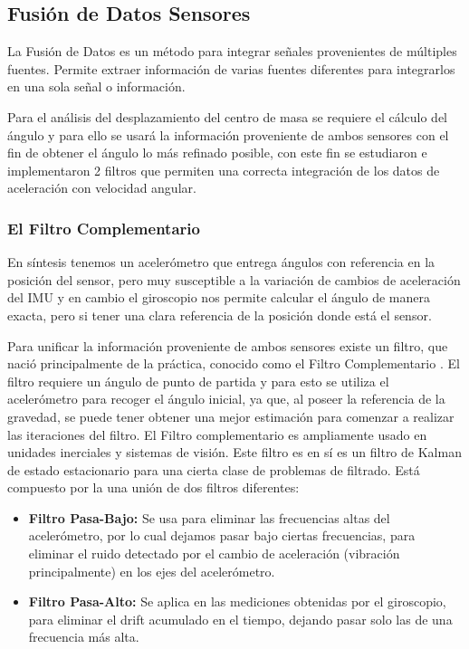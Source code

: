 \documentclass[12pt,a4paper]{article}
\begin{document}
\subsection{Fusión de Datos Sensores}
La Fusión de Datos es un método para integrar señales provenientes de múltiples fuentes. Permite extraer información de varias fuentes diferentes para integrarlos en una sola señal o información.

Para el análisis del desplazamiento del centro de masa se requiere el cálculo del ángulo y para ello se usará la información proveniente de ambos sensores con el fin de obtener el ángulo lo más refinado posible, con este fin se estudiaron e implementaron 2 filtros que permiten una correcta integración de los datos de aceleración con velocidad angular.

\subsubsection{El Filtro Complementario}

En síntesis tenemos un acelerómetro que entrega ángulos con referencia en la posición del sensor, pero muy susceptible a la variación de cambios de aceleración del IMU y en cambio el giroscopio nos permite calcular el ángulo de manera exacta, pero si tener una clara referencia de la posición donde está el sensor. 

Para unificar la información proveniente de ambos sensores existe un filtro, que nació principalmente de la práctica, conocido como el Filtro Complementario \cite[Capítulo 3, p.~44]{TesisUSM}.
El filtro requiere un ángulo de punto de partida y para esto se utiliza el acelerómetro para recoger el ángulo inicial, ya que, al poseer la referencia de la gravedad, se puede tener obtener una mejor estimación para comenzar a realizar las iteraciones del filtro.
\newline
El Filtro complementario es ampliamente usado en unidades inerciales y sistemas de visión. Este filtro es en sí es un filtro de Kalman de estado estacionario para una cierta clase de problemas de filtrado.
Está compuesto por la una unión de dos filtros diferentes:
\begin{itemize}
	\item \textbf{Filtro Pasa-Bajo:} Se usa para eliminar las frecuencias altas del acelerómetro, por lo cual dejamos pasar bajo ciertas frecuencias, para eliminar el ruido detectado por el cambio de aceleración (vibración principalmente) en los ejes del acelerómetro.
	\item \textbf{Filtro Pasa-Alto:} Se aplica en las mediciones obtenidas por el giroscopio, para eliminar el drift acumulado en el tiempo, dejando pasar solo las de una frecuencia más alta.
\end{itemize}
\end{document}
